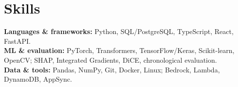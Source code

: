 \documentclass[11pt,a4paper]{article}
\begin{document}
\section{Skills}
\textbf{Languages \& frameworks:} Python, SQL/PostgreSQL, TypeScript, React, FastAPI.\\
\textbf{ML \& evaluation:} PyTorch, Transformers, TensorFlow/Keras, Scikit-learn, OpenCV; SHAP, Integrated Gradients, DiCE, chronological evaluation.\\
\textbf{Data \& tools:} Pandas, NumPy, Git, Docker, Linux; Bedrock, Lambda, DynamoDB, AppSync.
\end{document}
